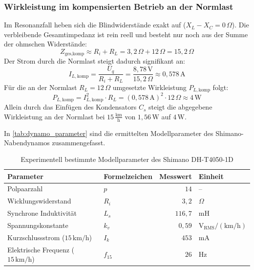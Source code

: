 \documentclass[12pt,a4paper]{article}
\begin{document}
\subsubsection{Wirkleistung im kompensierten Betrieb an der Normlast}
Im Resonanzfall heben sich die Blindwiderstände exakt auf ($X_L - X_C = 0\,\Omega$). 
Die verbleibende Gesamtimpedanz ist rein reell und besteht nur noch aus der Summe der ohmschen Widerstände:
\begin{equation*}
    Z_{\text{ges,komp}} \approx R_i + R_L = 3{,}2\,\Omega + 12\,\Omega = 15{,}2\,\Omega
\end{equation*}
Der Strom durch die Normlast steigt dadurch signifikant an:
\begin{equation*}
    I_{L,\text{komp}} = \frac{U_q}{R_i + R_L} = \frac{8{,}78\,\text{V}}{15{,}2\,\Omega} \approx 0{,}578\,\text{A}
\end{equation*}
Für die an der Normlast $R_L = 12\,\Omega$ umgesetzte Wirkleistung $P_{L,\text{komp}}$ folgt:
\begin{equation*}
    P_{L,\text{komp}} = I_{L,\text{komp}}^2 \cdot R_L = (0{,}578\,\text{A})^2 \cdot 12\,\Omega \approx 4\,\text{W}
\end{equation*}
Allein durch das Einfügen des Kondensators $C_s$ steigt die abgegebene Wirkleistung an der Normlast bei 
$15\,\frac{\text{km}}{\text{h}}$ von $1{,}56\,\text{W}$ auf $4\,\text{W}$.


In \autoref{tab:dynamo_parameter} sind die ermittelten Modellparameter des Shimano-Nabendynamos zusammengefasst.
\begin{table}[H]
    \centering
    \caption{Experimentell bestimmte Modellparameter des Shimano DH-T4050-1D}
    \label{tab:dynamo_parameter}
    \begin{tabular}{llrl}
        \toprule
        \textbf{Parameter} & \textbf{Formelzeichen} & \textbf{Messwert} & \textbf{Einheit} \\
        \midrule
        Polpaarzahl & $p$ & $14$ & -- \\
        Wicklungswiderstand & $R_i$ & $3{,}2$ & $\Omega$ \\
        Synchrone Induktivität & $L_s$ & $116{,}7$ & $\text{mH}$ \\
        Spannungskonstante & $k_v$ & $0{,}59$ & $\text{V}_{\text{RMS}} / (\text{km/h})$ \\
        Kurzschlussstrom ($15\,\text{km/h}$) & $I_k$ & $453$ & $\text{mA}$ \\
        Elektrische Frequenz ($15\,\text{km/h}$) & $f_{15}$ & $26$ & $\text{Hz}$ \\
        \bottomrule
    \end{tabular}
\end{table}
\end{document}

